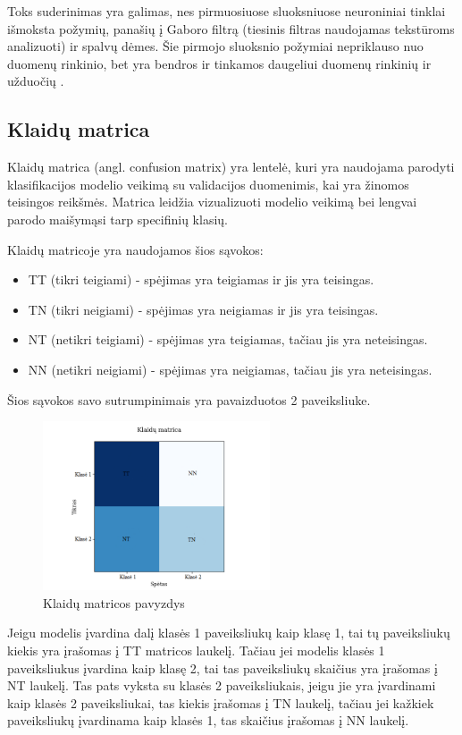 \documentclass{VUMIFPSbakalaurinis}
\begin{document}
Toks suderinimas yra galimas, nes pirmuosiuose sluoksniuose neuroniniai tinklai išmoksta požymių, panašių į Gaboro filtrą 
(tiesinis filtras naudojamas tekstūroms analizuoti) ir spalvų dėmes. Šie pirmojo sluoksnio požymiai nepriklauso nuo duomenų rinkinio, bet yra bendros ir tinkamos 
daugeliui duomenų rinkinių ir užduočių \cite{DBLP:journals/corr/YosinskiCBL14}.

\subsection{Klaidų matrica}
Klaidų matrica (angl. confusion matrix) yra lentelė, kuri yra naudojama parodyti klasifikacijos modelio veikimą su validacijos duomenimis, kai yra žinomos teisingos reikšmės. Matrica leidžia vizualizuoti modelio veikimą bei lengvai parodo maišymąsi tarp specifinių klasių.

Klaidų matricoje yra naudojamos šios sąvokos:
\begin{itemize}
    \item TT (tikri teigiami) - spėjimas yra teigiamas ir jis yra teisingas.
    \item TN (tikri neigiami) - spėjimas yra neigiamas ir jis yra teisingas.
    \item NT (netikri teigiami) - spėjimas yra teigiamas, tačiau jis yra neteisingas.
    \item NN (netikri neigiami) - spėjimas yra neigiamas, tačiau jis yra neteisingas.
\end{itemize}

Šios sąvokos savo sutrumpinimais yra pavaizduotos 2 paveiksliuke. 
\begin{figure}[H]
    \centering
    \includegraphics[width=0.6\textwidth]{img/KlaiduMatrica.png}
    \caption{Klaidų matricos pavyzdys}
    \label{fig:architecture}
\end{figure}
Jeigu modelis įvardina dalį klasės 1 paveiksliukų kaip klasę 1, tai tų paveiksliukų kiekis yra įrašomas į TT matricos laukelį. Tačiau jei modelis klasės 1 paveiksliukus įvardina kaip klasę 2, tai tas paveiksliukų skaičius yra įrašomas į NT laukelį. Tas pats vyksta su klasės 2 paveiksliukais, jeigu jie yra įvardinami kaip klasės 2 paveiksliukai, tas kiekis įrašomas į TN laukelį, tačiau jei kažkiek paveiksliukų įvardinama kaip klasės 1, tas skaičius įrašomas į NN laukelį. 
\end{document}
